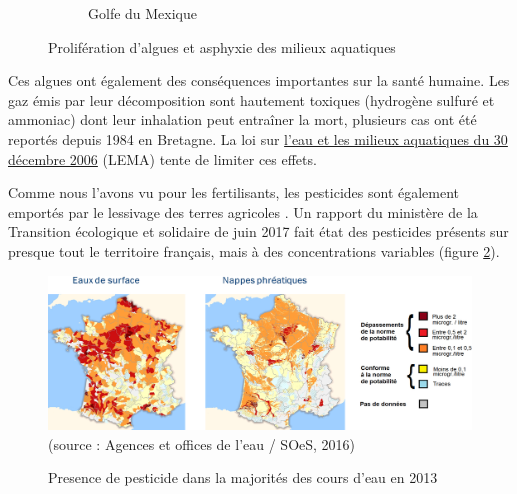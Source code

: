 \documentclass[../thesis.tex]{subfiles}
\begin{document}
\begin{figure}[H]
\begin{subfigure}{.3\textwidth}
            \scriptsize Golfe du Mexique
        \end{subfigure}
        \caption{Prolifération d'algues et asphyxie des milieux aquatiques}
        \label{fig:02-intro-limites-algues}
    \end{figure}
    \vfill
    
    \newpage
    Ces algues ont également des conséquences importantes sur la santé humaine. Les gaz émis par leur décomposition sont hautement toxiques (hydrogène sulfuré et ammoniac) dont leur inhalation peut entraîner la mort, plusieurs cas ont été reportés depuis 1984 en Bretagne. La loi sur \href{https://fr.wikipedia.org/wiki/Loi\_sur\_l\%27eau_et_les_milieux_aquatiques}{l'eau et les milieux aquatiques du 30 décembre 2006} (LEMA) tente de limiter ces effets.
    
    \par Comme nous l'avons vu pour les fertilisants, les pesticides sont également emportés par le lessivage des terres agricoles \cite{tournebize2020}. Un rapport du ministère de la Transition écologique et solidaire de juin 2017 fait état des pesticides présents sur presque tout le territoire français, mais à des concentrations variables (figure \ref{fig:02-intro-carte-pesticide}).
    
    \begin{figure}[H]
        \centering
        \includegraphics[width=\linewidth]{img/intro/intro-carte-pesticide-2}
        {\scriptsize (source : Agences et offices de l'eau / SOeS, 2016) }
        \caption{Presence de pesticide dans la majorités des cours d'eau en 2013}
        \label{fig:02-intro-carte-pesticide}
    \end{figure}
\end{document}
